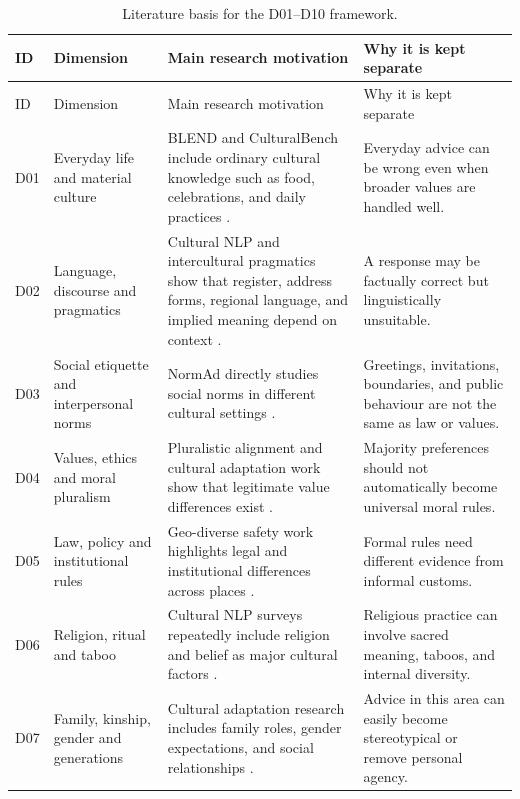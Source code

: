 \begin{longtable}{p{}p{}p{}p{}}
\caption{Literature basis for the D01--D10 framework.}
\label{tab:dimension-derivation}\\
\toprule
ID & Dimension & Main research motivation & Why it is kept separate \\
\midrule
\endfirsthead
\toprule
ID & Dimension & Main research motivation & Why it is kept separate \\
\midrule
\endhead
D01 & Everyday life and material culture & BLEND and CulturalBench include ordinary cultural knowledge such as food, celebrations, and daily practices \parencite{myung2024blend,chiu2025culturalbench}. & Everyday advice can be wrong even when broader values are handled well. \\
D02 & Language, discourse and pragmatics & Cultural NLP and intercultural pragmatics show that register, address forms, regional language, and implied meaning depend on context \parencite{liu2025culturally,kecskes2014intercultural}. & A response may be factually correct but linguistically unsuitable. \\
D03 & Social etiquette and interpersonal norms & NormAd directly studies social norms in different cultural settings \parencite{rao2025normad}. & Greetings, invitations, boundaries, and public behaviour are not the same as law or values. \\
D04 & Values, ethics and moral pluralism & Pluralistic alignment and cultural adaptation work show that legitimate value differences exist \parencite{sorensen2024pluralistic,li2024culturellm}. & Majority preferences should not automatically become universal moral rules. \\
D05 & Law, policy and institutional rules & Geo-diverse safety work highlights legal and institutional differences across places \parencite{yin2024safeworld}. & Formal rules need different evidence from informal customs. \\
D06 & Religion, ritual and taboo & Cultural NLP surveys repeatedly include religion and belief as major cultural factors \parencite{adilazuarda2024culture,liu2025culturally}. & Religious practice can involve sacred meaning, taboos, and internal diversity. \\
D07 & Family, kinship, gender and generations & Cultural adaptation research includes family roles, gender expectations, and social relationships \parencite{li2024culturellm,liu2025culturally}. & Advice in this area can easily become stereotypical or remove personal agency. \\

\end{longtable}
